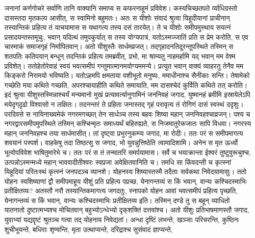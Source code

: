 \adhyAya
{}
\vakya जनानां कर्णगोचरे सर्वाणि तानि वाक्यानि समाप्य स कफरनाहूमं प्रविवेश।
\vakya कस्यचिच्छतपते र्व्याधिग्रस्तो दासस्तदा मृतकल्प आसीत्, स स्वामिनो बहुमतः।
\vakya अतः स यीशोः संवादं श्रुत्वा यिहूदीयानां प्राचीनान् तस्यान्तिकं प्रहित्य तं याचयामास स यथागत्य तस्य दसं तारयेत्।
\vakya ते च यीशोः समीपमुस्थाय सयत्नं प्रसादयन्तस्तमूचुः, भवान् यदित्थं तमुपकुर्यात् स तस्य योग्यपात्रं,
\vakya यतोऽस्मज्जातिं प्रति स प्रेम करोति, स एव चास्माकं समाजगृहं निर्मापितवान्।
\vakya अतो यीशुस्तैः सार्धमव्रजत्। तद्गृहादनतिदूरन्तूपस्थिते तस्मिन् स शतपतिः कतिपयान् बन्धून् तदन्तिकं प्रहित्य तमब्रवीत्, प्रभो, मा श्राम्यतु नाहमर्हामि यद् भवान् मम वेश्म प्रविशेत्।
\vakya ततोहेतोरेवाहं स्वयं भवत्समीपं गन्तुमात्मानमयोग्यममन्ये। प्रत्युत भवान् वाक्यं व्याहरतु तेनैव मम किङ्करो निरामयो भविष्यति।
\vakya यतोऽहमपि क्षमताया वशीभूतो मनुष्यः, ममाधीनाश्च सैनीकाः सन्ति। तेषामेको गच्छेति मया कथिते गच्छति, अपरश्चायाहीति कथिते समायाति, मम दासश्चेदं कुर्विति कथिते तत् करोति।
\vakya इदं श्रुत्वा यीशुस्तस्मिन्नाश्चर्यं मन्यमानो मुखं प्रत्यावर्त्यानुगामिनं जननिवहं जगाद, युष्मानहं ब्रवीमि इस्रायेलेऽपि मयेदृग्‌दृढो विश्वासो न लक्षितः।
\vakya तदनन्तरं ते प्रहिता जनास्तद् गृहं परावृत्य तं रोगिणं दासं स्वस्थं ददृशुः।
\vakya परदिवसे स नायिनाख्यमेकं नगरमगच्छत् तेन सार्धञ्च तस्य बहवः शिष्या महान् जननिवहश्चाव्रजन्।
\vakya पश्य च नगरद्वारसमीपमुपस्थिते तस्मिन् कश्चिन्मृतः समाध्यर्थं बहिरुह्यते, स निजमातुरेकजातः सापि विधवा। नगरस्य महान् जननिवहश्च तया सार्धमासीत्।
\vakya तां दृष्ट्वा प्रभुरनुकम्प्य जगाद, मा रोदीः।
\vakya ततः परं स समीपमागत्य शवयानं पस्पर्श। वाहकेषु तदा तिष्ठत्सु स जगाद, भो युवन्नुत्तिष्ठेति त्वामादिशामि।
\vakya अनेन स मृत ऊर्ध्वो भूत्वोपविवेश भाषितुमारेभे च।
\vakya ततः परं स तं तन्मातरि समर्पयामास। सर्वे च भयाक्रान्ता ईश्वरं तुष्टुवुरूचुश्च, उत्पन्नोऽस्मन्मध्ये महान् भाववादीतीश्वरः स्वप्रजा अवेक्षितवानिति च।
\vakya तमधि सा किंवदन्ती च कृत्स्नां यिहूदियां परितःस्थं कृत्स्नं जनपदञ्च व्यानशे।
\vakya योहनस्य शिष्यास्तस्मै तदैताः सर्वकथा निवेदयामासुः।
\vakya ततो योहनः स्वशिष्याणां द्वौ समीपमाहूय यीशुं प्रति प्रहित्य पप्रच्छ, येनागन्तव्यं स किं भवान्, वान्यः कश्चिदस्माभिः प्रतीक्षितव्यः?
\vakya अतस्तौ नरौ तस्यान्तिकमागत्य जगदतुः, स्नापको योहन आवां भवत्समीपं प्रहित्य पृच्छति, येनागन्तव्यं स किं भवान्, वान्यः कश्चिदस्माभिः प्रतीक्षितव्य इति।
\vakya तस्मिन् दण्डे तु स बहून् व्याधितो यातनातो दुष्टात्मभ्यश्च मोचितवान् बहुभ्योऽन्धेभ्यो दृक्‌शक्तिं दत्तवांश्च।
\vakya अतो यीशुः प्रतिभाषमाणस्तौ जगाद, युवाभ्यां यद्यद्दृष्टं श्रुतञ्च गत्वा तद् योहनाय निवेद्यतां। अन्धा दृष्टिं लभन्ते, खञ्जाः परिचरन्ति, कुष्ठिनः शुचीभूयन्ते, बधिराः शृण्वन्ति, मृता उत्थाप्यन्ते, दरिद्राश्च सुसंवादं ज्ञाप्यन्ते,
